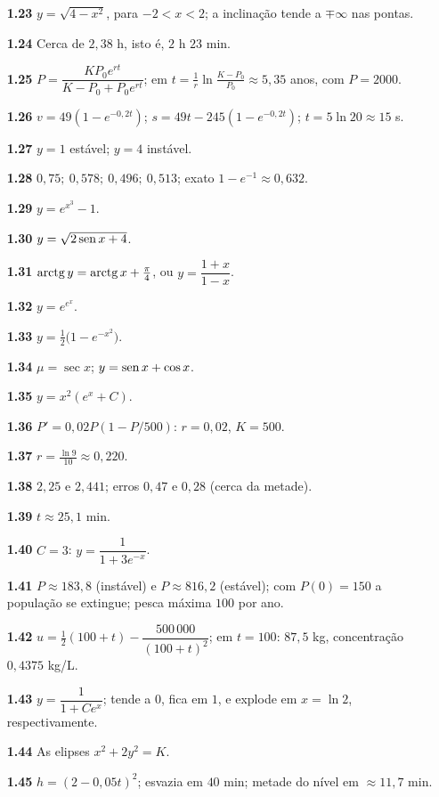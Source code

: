 {\begin{multicols}{2}
\begin{itemize}[leftmargin=2.7em,labelsep=0.5em,itemsep=1pt]
\item[\textbf{1.23}] $y=\sqrt{4-x^2}$, para $-2<x<2$; a inclinação tende a $\mp\infty$ nas pontas.
\item[\textbf{1.24}] Cerca de $2{,}38$ h, isto é, $2$ h $23$ min.
\item[\textbf{1.25}] $P=\dfrac{KP_0e^{rt}}{K-P_0+P_0e^{rt}}$; em $t=\frac1r\ln\frac{K-P_0}{P_0}\approx5{,}35$ anos, com $P=2000$.
\item[\textbf{1.26}] $v=49(1-e^{-0{,}2t})$; $s=49t-245(1-e^{-0{,}2t})$; $t=5\ln20\approx15$ s.
\item[\textbf{1.27}] $y=1$ estável; $y=4$ instável.
\item[\textbf{1.28}] $0{,}75;\ 0{,}578;\ 0{,}496;\ 0{,}513$; exato $1-e^{-1}\approx0{,}632$.
\item[\textbf{1.29}] $y=e^{x^3}-1$.
\item[\textbf{1.30}] $y=\sqrt{2\operatorname{sen} x+4}$.
\item[\textbf{1.31}] $\operatorname{arctg} y=\operatorname{arctg} x+\tfrac\pi4$, ou $y=\dfrac{1+x}{1-x}$.
\item[\textbf{1.32}] $y=e^{e^x}$.
\item[\textbf{1.33}] $y=\tfrac12\big(1-e^{-x^2}\big)$.
\item[\textbf{1.34}] $\mu=\sec x$; $y=\operatorname{sen} x+\cos x$.
\item[\textbf{1.35}] $y=x^2(e^x+C)$.
\item[\textbf{1.36}] $P'=0{,}02P(1-P/500)$: $r=0{,}02$, $K=500$.
\item[\textbf{1.37}] $r=\tfrac{\ln9}{10}\approx0{,}220$.
\item[\textbf{1.38}] $2{,}25$ e $2{,}441$; erros $0{,}47$ e $0{,}28$ (cerca da metade).
\item[\textbf{1.39}] $t\approx25{,}1$ min.
\item[\textbf{1.40}] $C=3$: $y=\dfrac1{1+3e^{-x}}$.
\item[\textbf{1.41}] $P\approx183{,}8$ (instável) e $P\approx816{,}2$ (estável); com $P(0)=150$ a população se extingue; pesca máxima $100$ por ano.
\item[\textbf{1.42}] $u=\tfrac12(100+t)-\dfrac{500\,000}{(100+t)^2}$; em $t=100$: $87{,}5$ kg, concentração $0{,}4375$ kg/L.
\item[\textbf{1.43}] $y=\dfrac1{1+Ce^x}$; tende a $0$, fica em $1$, e explode em $x=\ln2$, respectivamente.
\item[\textbf{1.44}] As elipses $x^2+2y^2=K$.
\item[\textbf{1.45}] $h=(2-0{,}05t)^2$; esvazia em $40$ min; metade do nível em $\approx11{,}7$ min.

\end{itemize}
\end{multicols}}
